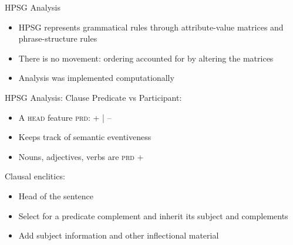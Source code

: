 \begin{comment}
\begin{frame}[fragile]{Clause: Summary}
\begin{itemize}
\item Clause: Predicate =inflection (participants)
\item Nouns, verbs, and adjectives can be predicates or participants
\item Some verbs are second-position suffixes
\item Modifiers precede what they modify, second position elements move accordingly
\end{itemize}

\begin{table}[]
\centering
\label{tab:2p}
\caption {Summary of second positions}
\adjustbox{max width=\textwidth}{
\begin{tabular}{llll}
 & \textbf{Syntactic domain} & \textbf{Attaches to} & \textbf{Meaning} \\ \hline
\textbf{Clausal enclitics} & Clause & First (non-extracted) word & tense, subject, mood \\ \hline
\textbf{Main predicate suffixes} & VP & First word in object (noun or adj) & transitive verbs \\ \hline
\textbf{Auxiliary predicate suffixes} & VP & First word in object (pred or adv) & modal-like verbs
\end{tabular}
}
\end{table}
	
\end{frame}
\end{comment}

\begin{frame}{HPSG Analysis}
\begin{itemize}
\item HPSG represents grammatical rules through attribute-value matrices and phrase-structure rules
\item There is no movement: ordering accounted for by altering the matrices
\item Analysis was implemented computationally
\end{itemize}
\end{frame}

\begin{frame}{HPSG Analysis: Clause}
Predicate vs Participant:
\begin{itemize}
\item A \textsc{head} feature \textsc{prd}: + | --
\item Keeps track of semantic eventiveness
\item Nouns, adjectives, verbs are \textsc{prd} +
\end{itemize}

Clausal enclitics:
\begin{itemize}
\item Head of the sentence
\item Select for a predicate complement and inherit its subject and complements
\item Add subject information and other inflectional material
\end{itemize}
\end{frame}


